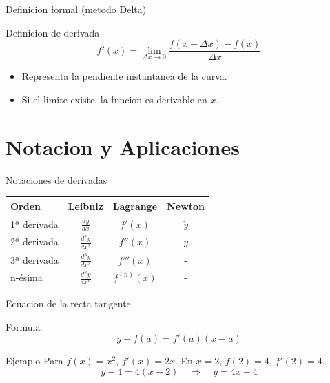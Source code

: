\documentclass[aspectratio=169, 10pt, xcolor=table]{beamer}
\begin{document}
\begin{frame}{Definicion formal (metodo Delta)}
    \begin{block}{Definicion de derivada}
        \[
        f'(x) = \lim_{\Delta x \to 0} \frac{f(x+\Delta x) - f(x)}{\Delta x}
        \]
    \end{block}
    \begin{itemize}
        \item Representa la pendiente instantanea de la curva.
        \item Si el limite existe, la funcion es derivable en $x$.
    \end{itemize}
\end{frame}

\section{Notacion y Aplicaciones}

\begin{frame}{Notaciones de derivadas}
    \begin{table}
        \centering
        \begin{tabular}{l|c|c|c}
            \toprule
            Orden & Leibniz & Lagrange & Newton \\
            \midrule
            1ª derivada & $\frac{dy}{dx}$ & $f'(x)$ & $\dot{y}$ \\
            2ª derivada & $\frac{d^2y}{dx^2}$ & $f''(x)$ & $\ddot{y}$ \\
            3ª derivada & $\frac{d^3y}{dx^3}$ & $f'''(x)$ & - \\
            n-ésima & $\frac{d^ny}{dx^n}$ & $f^{(n)}(x)$ & - \\
            \bottomrule
        \end{tabular}
    \end{table}
\end{frame}

\begin{frame}{Ecuacion de la recta tangente}
    \begin{block}{Formula}
        \[
        y - f(a) = f'(a)(x - a)
        \]
    \end{block}
    \begin{exampleblock}{Ejemplo}
        Para $f(x)=x^2$, $f'(x)=2x$. En $x=2$, $f(2)=4$, $f'(2)=4$.
        \[
        y - 4 = 4(x - 2) \quad\Rightarrow\quad y = 4x - 4
        \]
    \end{exampleblock}
\end{frame}
\end{document}
